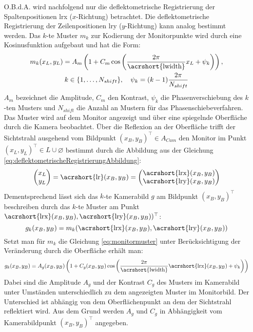 \p
O.B.d.A. wird nachfolgend nur die deflektometrische Registrierung der Spaltenpositionen \acrshort{lrx} ($x$-Richtung) betrachtet.
Die deflektometrische Registrierung der Zeilenpositionen \acrshort{lry} ($y$-Richtung) kann analog bestimmt werden.
Das $k$-te Muster $m_k$ zur Kodierung der Monitorpunkte wird durch eine Kosinusfunktion aufgebaut und hat die Form:
%
\begin{equation}\label{eq:monitormuster}
	\begin{gathered}	
		m_k(x_L,y_L) = A_m \left(1 + C_m \cos \left(\dfrac{2\pi}{\text{\acrshort{lwidth}}} x_L + \psi_k\right)\right),\\
		k \in \lbrace 1,\ldots,N_{shift}\rbrace,
		\quad
		\psi_k = (k - 1)\dfrac{2\pi}{N_{shift}}
	\end{gathered}
\end{equation}
%
$A_m$ bezeichnet die Amplitude, $C_m$ den Kontrast, $\psi_k$ die Phasenverschiebung des $k$-ten Musters und $N_{shift}$ die Anzahl an Mustern für das Phasenschiebeverfahren.
Das Muster wird auf dem Monitor angezeigt und über eine spiegelnde Oberfläche durch die Kamera beobachtet.
Über die Reflexion an der Oberfläche trifft der Sichtstrahl ausgehend vom Bildpunkt $(x_B, y_B)^\top \in A_{Cam}$ den Monitor im Punkt $(x_L, y_L)^\top \in L \cup \varnothing$ bestimmt durch die Abbildung aus der Gleichung \ref{eq:deflektometrischeRegistrierungAbbildung}:
%
\begin{equation}
	\begin{pmatrix}
		x_L \\ 
		y_L
	\end{pmatrix}
	= \text{\acrshort{lr}}(x_B, y_B) = 
	\begin{pmatrix}
		\text{\acrshort{lrx}}(x_B, y_B) \\ 
		\text{\acrshort{lry}}(x_B, y_B)
	\end{pmatrix} 
\end{equation}
%
Dementsprechend lässt sich das $k$-te Kamerabild $g$ am Bildpunkt $(x_B, y_B)^\top$ beschreiben durch das $k$-te Muster am Punkt $\text{\acrshort{lrx}}(x_B, y_B), \text{\acrshort{lry}}(x_B, y_B))^\top$:
%
\begin{equation}
	g_k(x_B, y_B) = m_k(\text{\acrshort{lrx}}(x_B, y_B), \text{\acrshort{lry}}(x_B, y_B))
\end{equation}
%
Setzt man für $m_k$ die Gleichung \ref{eq:monitormuster} unter Berücksichtigung der Veränderung durch die Oberfläche erhält man:
%
\begin{equation}\label{eq:kamerabild}
	g_k(x_B, y_B) = A_g(x_B, y_B) \left(1 + C_g(x_B, y_B) \cos \left(\dfrac{2\pi}{\text{\acrshort{lwidth}}}\text{\acrshort{lrx}}(x_B, y_B) + \psi_k\right)\right)
\end{equation}
%
Dabei sind die Amplitude $A_g$ und der Kontrast $C_g$ des Musters im Kamerabild unter Umständen unterschiedlich zu dem angezeigten Muster im Monitorbild.
Der Unterschied ist abhängig von dem Oberflächenpunkt an dem der Sichtstrahl reflektiert wird.
Aus dem Grund werden $A_g$ und $C_g$ in Abhängigkeit vom Kamerabildpunkt $(x_B, y_B)^\top$ angegeben.


